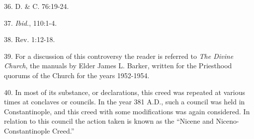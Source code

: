 36. D. \& C. 76:19-24.

37. \textit{Ibid.}, 110:1-4.

38. Rev. 1:12-18.

39. For a discussion of this controversy the reader is referred to \textit{The Divine Church}, the
manuals by Elder James L. Barker, written for the Priesthood quorums of the Church for the
years 1952-1954.

40. In most of its substance, or declarations, this creed was repeated at various times at
conclaves or councils. In the year 381 A.D., such a council was held in Constantinople, and
this creed with some modifications was again considered. In relation to this council the
action taken is known as the ``Nicene and Niceno-Constantinople Creed.''

